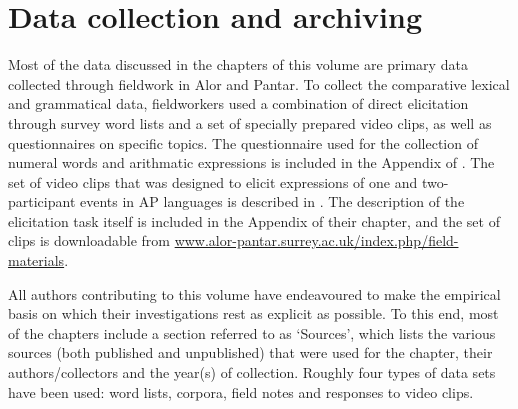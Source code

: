 \section{Data collection and archiving}\label{sec:1:8}

Most of the data discussed in the chapters of this volume are primary data collected through fieldwork in Alor and Pantar. To collect the comparative lexical and grammatical data, fieldworkers used a combination of direct elicitation through survey word lists and a set of specially prepared video clips, as well as questionnaires on specific topics. The questionnaire used for the collection of numeral words and arithmatic expressions is included in the Appendix of \citet{KlamerEtAlTV}. The set of video clips that was designed to elicit expressions of one and two-participant events in AP languages is described in \citet{FeddenEtAlTV}. The description of the elicitation task itself is included in the Appendix of their chapter, and the set of clips is downloadable from \url{www.alor-pantar.surrey.ac.uk/index.php/field-materials}.

All authors contributing to this volume have endeavoured to make the empirical basis on which their investigations rest as explicit as possible. To this end, most of the chapters include a section referred to as `Sources', which lists the various sources (both published and unpublished) that were used for the chapter, their authors/collectors and the year(s) of collection. Roughly four types of data sets have been used: word lists, corpora, field notes and responses to video clips. 

